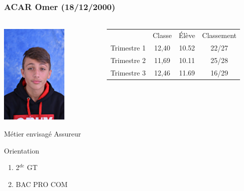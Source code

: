\documentclass{beamer}
\begin{document}
\begin{frame}
\frametitle{ACAR Omer (18/12/2000)}  
\framesubtitle{ }	


\begin{columns}[onlytextwidth]



\begin{column}{0.3\textwidth}
	\vspace*{.5cm}
	\begin{center}
			\includegraphics[scale=0.8]{tof}
	\end{center}

	
	\begin{block}{Métier envisagé}
		Assureur
	\end{block}
	
	\begin{alertblock}{Orientation}
		\begin{enumerate}
			\item 2$^{de}$ GT
			\item BAC PRO COM
		\end{enumerate}
	\end{alertblock}
	
	
\end{column}	

\begin{column}{0.70\textwidth}
	
		\begin{center}
		
		\vspace*{-.7cm}	

		{\small \begin{tabular}{cccc}
			& Classe                       & \'Elève                      & Classement                   \\
			{\color[HTML]{00009B} Trimestre 1} & {\color[HTML]{00009B} 12,40} & {\color[HTML]{00009B} 10.52} & {\color[HTML]{00009B} 22/27} \\ \hline
			{\color[HTML]{FE0000} Trimestre 2} & {\color[HTML]{FE0000} 11,69} & {\color[HTML]{FE0000} 10.11} & {\color[HTML]{FE0000} 25/28} \\ \hline
			{\color[HTML]{34FF34} Trimestre 3} & {\color[HTML]{34FF34} 12,46} & {\color[HTML]{34FF34} 11.69} & {\color[HTML]{34FF34} 16/29}
		\end{tabular}}
		

\end{center}
\end{column}
\end{columns}
\end{frame}
\end{document}
